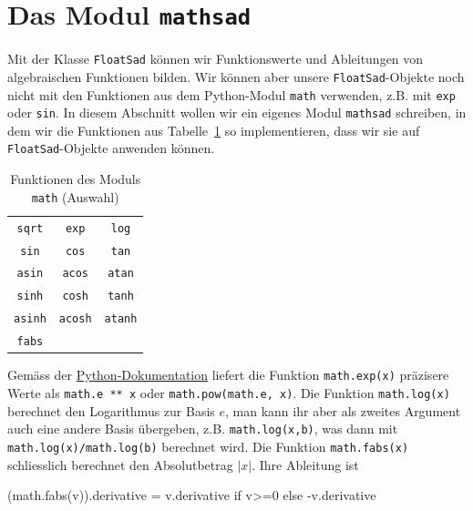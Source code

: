 \documentclass[
  letterpaper,
  DIV=11,
  oneside]{scrreprt}
\newenvironment{Shaded}{\begin{snugshade}}{\end{snugshade}}
\newcommand{\ControlFlowTok}[1]{\textcolor[rgb]{0.00,0.23,0.31}{#1}}
\newcommand{\DecValTok}[1]{\textcolor[rgb]{0.68,0.00,0.00}{#1}}
\newcommand{\NormalTok}[1]{\textcolor[rgb]{0.00,0.23,0.31}{#1}}
\newcommand{\OperatorTok}[1]{\textcolor[rgb]{0.37,0.37,0.37}{#1}}
\theoremstyle{definition}
\theoremstyle{definition}
\theoremstyle{remark}
\begin{document}
\hypertarget{das-modul-mathsad}{%
\section{\texorpdfstring{Das Modul
\texttt{mathsad}}{Das Modul mathsad}}\label{das-modul-mathsad}}

Mit der Klasse \texttt{FloatSad} können wir Funktionswerte und
Ableitungen von algebraischen Funktionen bilden. Wir können aber unsere
\texttt{FloatSad}-Objekte noch nicht mit den Funktionen aus dem
Python-Modul \texttt{math} verwenden, z.B. mit \texttt{exp} oder
\texttt{sin}. In diesem Abschnitt wollen wir ein eigenes Modul
\texttt{mathsad} schreiben, in dem wir die Funktionen aus
Tabelle~\ref{tbl-mathFunctions} so implementieren, dass wir sie auf
\texttt{FloatSad}-Objekte anwenden können.

\hypertarget{tbl-mathFunctions}{}
\begin{longtable}[]{@{}ccc@{}}
\caption{\label{tbl-mathFunctions}Funktionen des Moduls \texttt{math}
(Auswahl)}\tabularnewline
\toprule()
\endhead
\texttt{sqrt} & \texttt{exp} & \texttt{log} \\
\texttt{sin} & \texttt{cos} & \texttt{tan} \\
\texttt{asin} & \texttt{acos} & \texttt{atan} \\
\texttt{sinh} & \texttt{cosh} & \texttt{tanh} \\
\texttt{asinh} & \texttt{acosh} & \texttt{atanh} \\
\texttt{fabs} & & \\
\bottomrule()
\end{longtable}

Gemäss der
\href{https://docs.python.org/3.8/library/math.html}{Python-Dokumentation}
liefert die Funktion \texttt{math.exp(x)} präzisere Werte als
\texttt{math.e\ **\ x} oder \texttt{math.pow(math.e,\ x)}. Die Funktion
\texttt{math.log(x)} berechnet den Logarithmus zur Basis \(e\), man kann
ihr aber als zweites Argument auch eine andere Basis übergeben, z.B.
\texttt{math.log(x,b)}, was dann mit \texttt{math.log(x)/math.log(b)}
berechnet wird. Die Funktion \texttt{math.fabs(x)} schliesslich
berechnet den Absolutbetrag \(|x|\). Ihre Ableitung ist

\begin{Shaded}
\begin{Highlighting}[]
\NormalTok{(math.fabs(v)).derivative }\OperatorTok{=}\NormalTok{ v.derivative }\ControlFlowTok{if}\NormalTok{ v}\OperatorTok{\textgreater{}=}\DecValTok{0} \ControlFlowTok{else} \OperatorTok{{-}}\NormalTok{v.derivative}
\end{Highlighting}
\end{Shaded}
\end{document}
